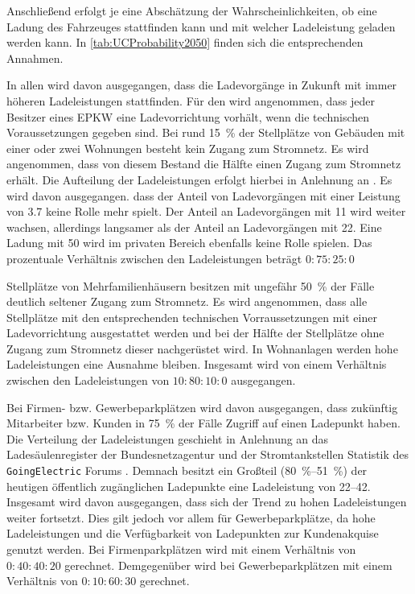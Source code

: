 Anschließend erfolgt je \UC eine Abschätzung der Wahrscheinlichkeiten, ob eine Ladung des Fahrzeuges stattfinden kann und mit welcher Ladeleistung geladen werden kann.
In \autoref{tab:UCProbability2050} finden sich die entsprechenden Annahmen.



In allen \UCs wird davon ausgegangen, dass die Ladevorgänge in Zukunft mit immer höheren Ladeleistungen stattfinden.
Für den \UC \Eigenheim wird angenommen, dass jeder Besitzer eines \gls{EPKW} eine Ladevorrichtung vorhält, wenn die technischen Voraussetzungen gegeben sind.
Bei rund \SI{15}{\percent} der Stellplätze von Gebäuden mit einer oder zwei Wohnungen besteht kein Zugang zum Stromnetz. \cite{dena2020}
Es wird angenommen, dass von diesem Bestand die Hälfte einen Zugang zum Stromnetz erhält.
Die Aufteilung der Ladeleistungen erfolgt hierbei in Anlehnung an \cite{NPZMAVE2020}.
Es wird davon ausgegangen. dass der Anteil von Ladevorgängen mit einer Leistung von \SI{3.7}{\kw} keine Rolle mehr spielt.
Der Anteil an Ladevorgängen mit \SI{11}{\kw} wird weiter wachsen, allerdings langsamer als der Anteil an Ladevorgängen mit \SI{22}{\kw}.
Eine Ladung mit \SI{50}{\kw} wird im privaten Bereich ebenfalls keine Rolle spielen.
Das prozentuale Verhältnis zwischen den Ladeleistungen beträgt \(0:75:25:0\)\medskip

Stellplätze von Mehrfamilienhäusern besitzen mit ungefähr \SI{50}{\percent} der Fälle deutlich seltener Zugang zum Stromnetz. \cite{dena2020}
Es wird angenommen, dass alle Stellplätze mit den entsprechenden technischen Vorraussetzungen mit einer Ladevorrichtung ausgestattet werden und bei der Hälfte der Stellplätze ohne Zugang zum Stromnetz dieser nachgerüstet wird.
In Wohnanlagen werden hohe Ladeleistungen eine Ausnahme bleiben.
Insgesamt wird von einem Verhältnis zwischen den Ladeleistungen von \(10:80:10:0\) ausgegangen.\medskip

Bei Firmen- bzw. Gewerbeparkplätzen wird davon ausgegangen, dass zukünftig Mitarbeiter bzw. Kunden in \SI{75}{\percent} der Fälle Zugriff auf einen Ladepunkt haben.
Die Verteilung der Ladeleistungen geschieht in Anlehnung an das Ladesäulenregister der Bundesnetzagentur \cite[][Stand: ]{BundesnetzagenturElektrizitaet2020} und der Stromtankstellen Statistik des \texttt{GoingElectric} Forums \cite[][Stand: ]{Weemaes2020}.
Demnach besitzt ein Großteil (\SIrange[range-phrase=~bzw.~]{80}{51}{\percent}) der heutigen öffentlich zugänglichen Ladepunkte eine Ladeleistung von \SIrange{22}{42}{\kw}.
Insgesamt wird davon ausgegangen, dass sich der Trend zu hohen Ladeleistungen weiter fortsetzt.
Dies gilt jedoch vor allem für Gewerbeparkplätze, da hohe Ladeleistungen und die Verfügbarkeit von Ladepunkten zur Kundenakquise genutzt werden.
Bei Firmenparkplätzen wird mit einem Verhältnis von \(0:40:40:20\) gerechnet.
Demgegenüber wird bei Gewerbeparkplätzen mit einem Verhältnis von \(0:10:60:30\) gerechnet.\medskip


